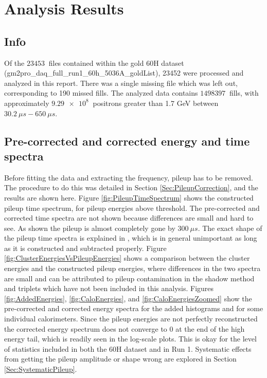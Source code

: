 \graphicspath{ {Figures/Pileup/Energies/} {Figures/Pileup/TimeSpectra/} {Figures/Main/} {Figures/ResidualsFFT/} {Figures/FitStartScans/} {Figures/FitEndScans/} {Figures/PerCalo/} }

\chapter{Analysis Results}
\label{Ch:Results}

\section{Info}

Of the $\SI{23453}{}$ files contained within the gold 60H dataset (gm2pro\_daq\_full\_run1\_60h\_5036A\_goldList), 23452 were processed and analyzed in this report. There was a single missing file which was left out, corresponding to 190 missed fills. The analyzed data contains $\SI{1498397}{}$ fills, with approximately $\SI{9.29e8}{}$ positrons greater than 1.7 GeV between $\SI{30.2}{\mu s} - \SI{650}{\mu s}$.

\section{Pre-corrected and corrected energy and time spectra}

	Before fitting the data and extracting the \gmtwo frequency, pileup has to be removed. The procedure to do this was detailed in Section \ref{Sec:PileupCorrection}, and the results are shown here. Figure \ref{fig:PileupTimeSpectrum} shows the constructed pileup time spectrum, for pileup energies above threshold. The pre-corrected and corrected time spectra are not shown because differences are small and hard to see. As shown the pileup is almost completely gone by $\SI{300}{\mu s}$. The exact shape of the pileup time spectra is explained in , which is in general unimportant as long as it is constructed and subtracted properly. Figure \ref{fig:ClusterEnergiesVsPileupEnergies} shows a comparison between the cluster energies and the constructed pileup energies, where differences in the two spectra are small and can be attributed to pileup contamination in the shadow method and triplets which have not been included in this analysis. Figures \ref{fig:AddedEnergies}, \ref{fig:CaloEnergies}, and \ref{fig:CaloEnergiesZoomed} show the pre-corrected and corrected energy spectra for the added histograms and for some individual calorimeters. Since the pileup energies are not perfectly reconstructed the corrected energy spectrum does not converge to 0 at the end of the high energy tail, which is readily seen in the log-scale plots. This is okay for the level of statistics included in both the 60H dataset and in Run 1. Systematic effects from getting the pileup amplitude or shape wrong are explored in Section \ref{Sec:SystematicPileup}.

